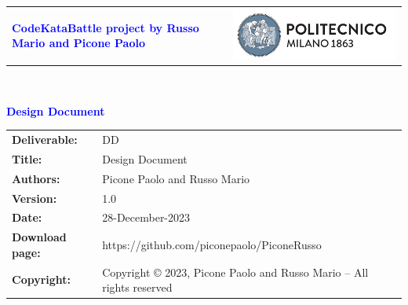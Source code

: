




\begin{titlepage}



{\begin{table}[t!]
\centering
\begin{tabu} to \textwidth { X[1.3,r,p] X[1.7,l,p] }
\textcolor{Blue}
{\textbf{\small{CodeKataBattle project by Russo Mario and Picone Paolo}}} & \includegraphics[scale=0.5]{Images/PolimiLogo}
\end{tabu}
\end{table}}~\\ [7cm]


\begin{flushleft}

{\textcolor{Blue}{\textbf{\Huge{Design Document}}}} \\ [1cm]

\end{flushleft}

\end{titlepage}

\begin{table}[h!]
\begin{tabu} to \textwidth { X[0.3,r,p] X[0.7,l,p] }
\hline

\textbf{Deliverable:} & DD\\
\textbf{Title:} & Design Document \\
\textbf{Authors:} & Picone Paolo and Russo Mario\\
\textbf{Version:} & 1.0 \\ 
\textbf{Date:} & 28-December-2023 \\
\textbf{Download page:} & https://github.com/piconepaolo/PiconeRusso \\
\textbf{Copyright:} & Copyright © 2023, Picone Paolo and Russo Mario – All rights reserved \\
\hline
\end{tabu}
\end{table}




